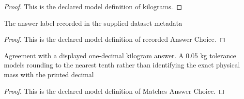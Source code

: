 \begin{proof}
  This is the declared model definition of kilograms.
\end{proof}
\begin{definition}
  \label{def:physics:phyx-mini-0204:phyxminiproblems-problemphyxmini0204-recordedanswerchoice}
  The answer label recorded in the supplied dataset metadata
\end{definition}
\begin{proof}
  This is the declared model definition of recorded Answer Choice.
\end{proof}
\begin{definition}
  \label{def:physics:phyx-mini-0204:phyxminiproblems-problemphyxmini0204-matchesanswerchoice}
  Agreement with a displayed one-decimal kilogram answer. A 0.05 kg tolerance models rounding to the nearest tenth rather than identifying the exact physical mass with the printed decimal
\end{definition}
\begin{proof}
  This is the declared model definition of Matches Answer Choice.
\end{proof}
